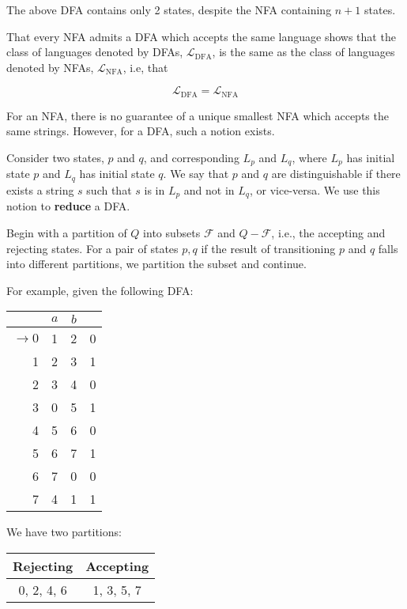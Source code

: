 The above DFA contains only 2 states, despite the NFA containing \(n+1\) states.

That every NFA admits a DFA which accepts the same language shows that the class of languages denoted by DFAs, \(\mathcal{L}_{\text{DFA}}\), is the same as the class of languages denoted by NFAs, \(\mathcal{L}_{\text{NFA}}\), i.e, that

\[\mathcal{L}_{\text{DFA}} = \mathcal{L}_{\text{NFA}}\]

For an NFA, there is no guarantee of a unique smallest NFA which accepts the same strings. However, for a DFA, such a notion exists.

Consider two states, \(p\) and \(q\), and corresponding \(L_p\) and \(L_q\), where \(L_p\) has initial state \(p\) and \(L_q\) has initial state \(q\). We say that \(p\) and \(q\) are distinguishable if there exists a string \(s\) such that \(s\) is in \(L_p\) and not in \(L_q\), or vice-versa. We use this notion to \textbf{reduce} a DFA.

Begin with a partition of \(Q\) into subsets \(\mathcal{F}\) and \(Q-\mathcal{F}\), i.e., the accepting and rejecting states. For a pair of states \(p, q\) if the result of transitioning \(p\) and \(q\) falls into different partitions, we partition the subset and continue.

For example, given the following DFA:

\begin{center}\begin{tabular}{r| c c r}
         & \(a\) & \(b\) & \\\bottomrule
         \(\to 0\) & 1 & 2 & 0\\
               1 & 2 & 3 & 1\\
               2 & 3 & 4 & 0\\
               3 & 0 & 5 & 1\\
               4 & 5 & 6 & 0\\
               5 & 6 & 7 & 1\\
               6 & 7 & 0 & 0\\
               7 & 4 & 1 & 1
    \end{tabular}\end{center}

We have two partitions:

\begin{center}\begin{tabular}{c|c|c|c|c|c|c|c}
\multicolumn{4}{c|}{Rejecting} & \multicolumn{4}{|c}{Accepting}\\\bottomrule
\multicolumn{4}{c|}{0, 2, 4, 6} & \multicolumn{4}{|c}{1, 3, 5, 7}
\end{tabular}\end{center}

